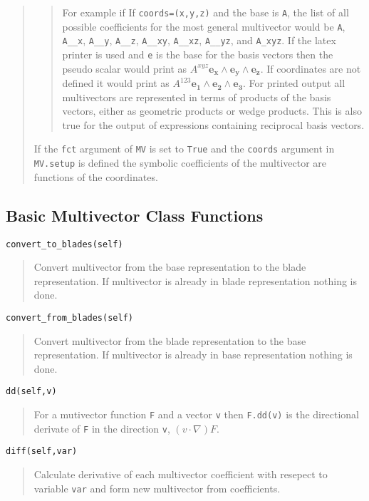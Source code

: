 \documentclass[10pt]{article}
\newcommand{\W}{\wedge}
\newcommand{\T}[1]{\texttt{#1}}
\begin{document}
\begin{quote}
\begin{quote}
     For example if If \T{coords=(x,y,z)} and the base is \T{A}, the list of all possible
     coefficients for the most general multivector would be \T{A}, \T{A\_\_x}, \T{A\_\_y}, \T{A\_\_z},
     \T{A\_\_xy}, \T{A\_\_xz}, \T{A\_\_yz}, and \T{A\_xyz}.  If the latex printer is used and \T{e} is the
     base for the basis vectors then the pseudo scalar would print as
     $A^{xyz}\bm{e_{x}\W e_{y}\W e_{z}}$. If coordinates are not defined it would print
     as $A^{123}\bm{e_{1}\W e_{2}\W e_{3}}$.  For printed output all multivectors are represented
     in terms of products of the basis vectors, either as geometric products or wedge products. This
     is also true for the output of expressions containing reciprocal basis vectors.
     \end{quote}

   If the \T{fct} argument of \T{MV} is set to \T{True} and the \T{coords} argument in
   \T{MV.setup} is defined the symbolic coefficients of the multivector are functions
   of the coordinates.
\end{quote}


\subsection{Basic Multivector Class Functions}

\T{convert\_to\_blades(self)}
\begin{quote}
   Convert multivector from the base representation to the blade representation.
   If multivector is already in blade representation nothing is done.
\end{quote}

\T{convert\_from\_blades(self)}
\begin{quote}
   Convert multivector from the blade representation to the base representation.
   If multivector is already in base representation nothing is done.
\end{quote}

\T{dd(self,v)}
\begin{quote}
   For a mutivector function \T{F} and a vector \T{v} then \T{F.dd(v)} is the
   directional derivate of \T{F} in the direction \T{v}, $( v\cdot\nabla ) F$.
\end{quote}

\T{diff(self,var)}
\begin{quote}
   Calculate derivative of each multivector coefficient with resepect to
   variable \T{var} and form new multivector from coefficients.
\end{quote}
\end{document}
